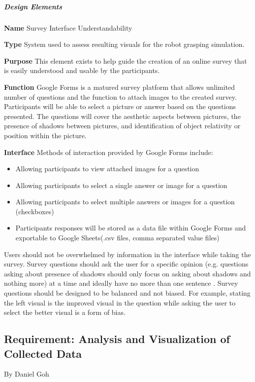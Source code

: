 \begin{flushleft}
\subparagraph{Design Elements}
\textbf{Name}
Survey Interface Understandability

\textbf{Type}
System used to assess resulting visuals for the robot grasping simulation. 

\textbf{Purpose}
This element exists to help guide the creation of an online survey that is easily understood and usable by the participants. 

\textbf{Function}
Google Forms \cite{googleforms} is a matured survey platform that allows unlimited number of questions and the function to attach images to the created survey.
Participants will be able to select a picture or answer based on the questions presented. 
The questions will cover the aesthetic aspects between pictures, the presence of shadows between pictures, and identification of object relativity or position within the picture. 

\textbf{Interface}
Methods of interaction provided by Google Forms include:
\begin{itemize}
\item Allowing participants to view attached images for a question
\item Allowing participants to select a single answer or image for a question
\item Allowing participants to select multiple answers or images for a question  (checkboxes)
\item Participants responses will be stored as a data file within Google Forms and exportable to Google Sheets(.csv files, comma separated value files)
\end{itemize}

Users should not be overwhelmed by information in the interface while taking the survey.
Survey questions should ask the user for a specific opinion (e.g. questions asking about presence of shadows should only focus on asking about shadows and nothing more) at a time and ideally have no more than one sentence \cite{SMquestions}. 
Survey questions should be designed to be balanced and not biased.
For example, stating the left visual is the improved visual in the question while asking the user to select the better visual is a form of bias.  

\newpage

\subsection{Requirement: Analysis and Visualization of Collected Data}
\large{By Daniel Goh}


\end{flushleft}
